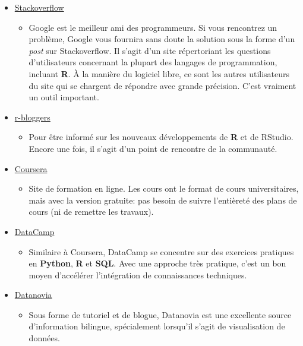 \documentclass[10.5pt,a4paper]{article}
\begin{document}
\begin{itemize}
  \item \href{https://stackoverflow.com}{Stackoverflow}
    \begin{itemize}
      \item Google est le meilleur ami des programmeurs. Si vous rencontrez un problème, Google vous fournira sans doute la solution sous la forme d'un \textit{post} sur Stackoverflow. Il s'agit d'un site répertoriant les questions d'utilisateurs concernant la plupart des langages de programmation, incluant \textbf{R}. À la manière du logiciel libre, ce sont les autres utilisateurs du site qui se chargent de répondre avec grande précision. C'est vraiment un outil important. 
    \end{itemize}
  \item \href{https://www.r-bloggers.com}{r-bloggers}
    \begin{itemize}
      \item Pour être informé sur les nouveaux développements de \textbf{R} et de RStudio. Encore une fois, il s'agit d'un point de rencontre de la communauté.
    \end{itemize}
  \item \href{https://www.coursera.org}{Coursera}
    \begin{itemize}
      \item Site de formation en ligne. Les cours ont le format de cours universitaires, mais avec la version gratuite: pas besoin de suivre l’entièreté des plans de cours (ni de remettre les travaux).
    \end{itemize}
  \item \href{https://www.datacamp.com}{DataCamp}
    \begin{itemize}
      \item Similaire à Coursera, DataCamp se concentre sur des exercices pratiques en \textbf{Python}, \textbf{R} et \textbf{SQL}. Avec une approche très pratique, c'est un bon moyen d'accélérer l'intégration de connaissances techniques. 
    \end{itemize}
\item \href{https://www.datanovia.com/en/}{Datanovia}
    \begin{itemize}
      \item Sous forme de tutoriel et de blogue, Datanovia est une excellente source d'information bilingue, spécialement lorsqu'il s'agit de visualisation de données.
    \end{itemize}
\end{itemize}
\end{document}
